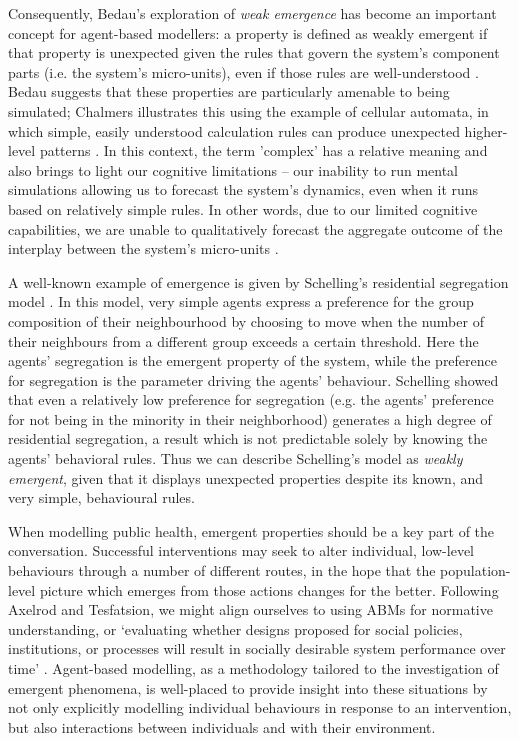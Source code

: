 \documentclass[review]{elsarticle}
\begin{document}
Consequently, Bedau's exploration of \emph{weak emergence} has become an important concept for agent-based modellers: a property is defined as weakly emergent if that property is unexpected given the rules that govern the system's component parts (i.e. the system's micro-units), even if those rules are well-understood \citep{bedau97b}.  Bedau suggests that these properties are particularly amenable to being simulated; Chalmers illustrates this using the example of cellular automata, in which simple, easily understood calculation rules can produce unexpected higher-level patterns \citep{chalmers2006}. In this context, the term 'complex' has a relative meaning and also brings to light our cognitive limitations -- our inability to run mental simulations allowing us to forecast the system's dynamics, even when it runs based on relatively simple rules. In other words, due to our limited cognitive capabilities, we are unable to qualitatively forecast the aggregate outcome of the interplay between the system's micro-units \citep{berkman2011}.

A well-known example of emergence is given by Schelling's residential segregation model \citep{schelling71, schelling78}. In this model, very simple agents express a preference for the group composition of their neighbourhood by choosing to move when the number of their neighbours from a different group exceeds a certain threshold.  Here the agents' segregation is the emergent property of the system, while the preference for segregation is the parameter driving the agents' behaviour. Schelling showed that even a relatively low preference for segregation (e.g. the agents' preference for not being in the minority in their neighborhood) generates a high degree of residential segregation, a result which is not predictable solely by knowing the agents' behavioral rules.  Thus we can describe Schelling's model as \emph{weakly emergent}, given that it displays unexpected properties despite its known, and very simple, behavioural rules.

When modelling public health, emergent properties should be a key part of the conversation.  Successful interventions may seek to alter individual, low-level behaviours through a number of different routes, in the hope that the population-level picture which emerges from those actions changes for the better. Following Axelrod and Tesfatsion, we might align ourselves to using ABMs for normative understanding, or `evaluating whether designs proposed for social policies, institutions, or processes will result in socially desirable system performance over time' \citep{axelrod05}.  Agent-based modelling, as a methodology tailored to the investigation of emergent phenomena, is well-placed to provide insight into these situations by not only explicitly modelling individual behaviours in response to an intervention, but also interactions between individuals and with their environment.
\end{document}
